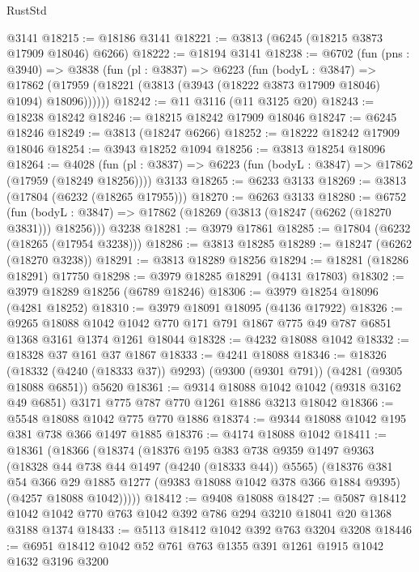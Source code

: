 \begin{lexlean}{RustStd}
\begin{coremodule}
{\begin{coremodule}
{{{{{{{{{{{{{{{{{{{{{{{{{{{{{{{{{{{    @3141
@18215 := @18186 @3141
@18221 := @3813 (@6245 (@18215 @3873 @17909 @18046) @6266)
@18222 := @18194 @3141
@18238 := @6702
    (fun (pns : @3940) =>
    @3838
      (fun (pl : @3837) =>
      @6223
        (fun (bodyL : @3847) =>
        @17862 (@17959 (@18221 (@3813 (@3943 (@18222 @3873 @17909 @18046) @1094) @18096))))))
@18242 := @11 @3116 (@11 @3125 @20)
@18243 := @18238 @18242
@18246 := @18215 @18242 @17909 @18046
@18247 := @6245 @18246
@18249 := @3813 (@18247 @6266)
@18252 := @18222 @18242 @17909 @18046
@18254 := @3943 @18252 @1094
@18256 := @3813 @18254 @18096
@18264 := @4028
    (fun (pl : @3837) => @6223 (fun (bodyL : @3847) => @17862 (@17959 (@18249 @18256))))
    @3133
@18265 := @6233 @3133
@18269 := @3813 (@17804 (@6232 (@18265 @17955)))
@18270 := @6263 @3133
@18280 := @6752
    (fun (bodyL : @3847) => @17862 (@18269 (@3813 (@18247 (@6262 (@18270 @3831))) @18256)))
    @3238
@18281 := @3979 @17861
@18285 := @17804 (@6232 (@18265 (@17954 @3238)))
@18286 := @3813 @18285
@18289 := @18247 (@6262 (@18270 @3238))
@18291 := @3813 @18289 @18256
@18294 := @18281 (@18286 @18291) @17750
@18298 := @3979 @18285 @18291 (@4131 @17803)
@18302 := @3979 @18289 @18256 (@6789 @18246)
@18306 := @3979 @18254 @18096 (@4281 @18252)
@18310 := @3979 @18091 @18095 (@4136 @17922)
@18326 := @9265
    @18088
    @1042
    @1042
    @770
    @171
    @791
    @1867
    @775
    @49
    @787
    @6851
    @1368
    @3161
    @1374
    @1261
    @18044
@18328 := @4232 @18088 @1042
@18332 := @18328 @37 @161 @37 @1867
@18333 := @4241 @18088
@18346 := @18326
    (@18332 (@4240 (@18333 @37)) @9293)
    (@9300 (@9301 @791))
    (@4281 (@9305 @18088 @6851))
    @5620
@18361 := @9314
    @18088
    @1042
    @1042
    (@9318 @3162 @49 @6851)
    @3171
    @775
    @787
    @770
    @1261
    @1886
    @3213
    @18042
@18366 := @5548 @18088 @1042 @775 @770 @1886
@18374 := @9344 @18088 @1042 @195 @381 @738 @366 @1497 @1885
@18376 := @4174 @18088 @1042
@18411 := @18361
    (@18366
      (@18374
        (@18376
          @195
          @383
          @738
          @9359
          @1497
          @9363
          (@18328 @44 @738 @44 @1497 (@4240 (@18333 @44)) @5565)
          (@18376
            @381
            @54
            @366
            @29
            @1885
            @1277
            (@9383 @18088 @1042 @378 @366 @1884 @9395)
            (@4257 @18088 @1042)))))
@18412 := @9408 @18088
@18427 := @5087 @18412 @1042 @1042 @770 @763 @1042 @392 @786 @294 @3210 @18041 @20 @1368 @3188 @1374
@18433 := @5113 @18412 @1042 @392 @763 @3204 @3208
@18446 := @6951 @18412 @1042 @52 @761 @763 @1355 @391 @1261 @1915 @1042 @1632 @3196 @3200
}}}}}}}}}}}}}}}}}}}}}}}}}}}}}}}}}}}
\end{coremodule}}
\end{coremodule}
\end{lexlean}

